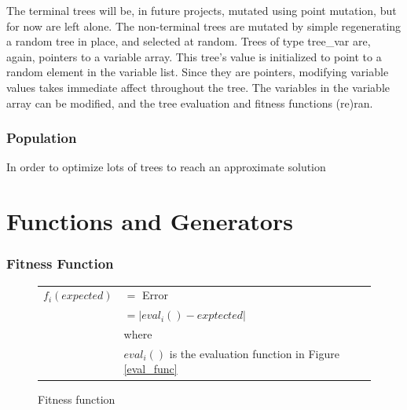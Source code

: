 \documentclass[12pt]{article}
\begin{document}
The terminal trees will be, in future projects, mutated using point mutation, but for now are left alone. The non-terminal trees are mutated by simple regenerating a random tree in place, and selected at random. Trees of type tree\_var are, again, pointers to a variable array. This tree's value is initialized to point to a random element in the variable list. Since they are pointers, modifying variable values takes immediate affect throughout the tree. The variables in the variable array can be modified, and the tree evaluation and fitness functions (re)ran. 

\section{Population}
\label{sec:population}
In order to optimize lots of trees to reach an approximate solution


\part{Functions and Generators}
\section{Fitness Function}
\begin{figure}[!h]
        \begin{center}
		\begin{tabular}{r l}
			$ f_i(expected) $		&	$ = $ Error \\
								&	$ = | eval_i() - exptected | $ \\
								& where \\
								& $ eval_i() $ is the evaluation function in Figure \ref{eval_func}\\
		\end{tabular}
               \caption{Fitness function}
                \label{fit_func}
        \end{center}
\end{figure}
\end{document}
